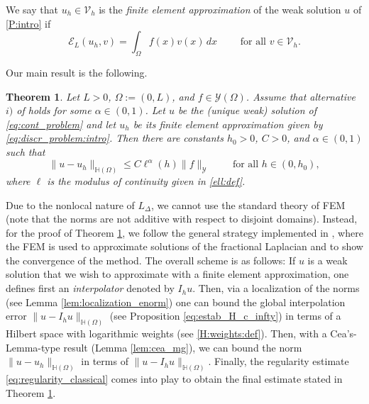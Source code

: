 \documentclass[10 pt]{article}
\newtheorem{theorem}{Theorem}[section]
\numberwithin{equation}{section}
\def\cE{\mathcal{E}}
\begin{document}
We say that  $u_h\in \mathcal V_h$ is the \emph{finite element approximation} of the weak solution $u$ of \eqref{P:intro} if \begin{equation}\label{eq:discr_problem:intro}
    \cE_{L}(u_h,v)=\int_{\Omega} f(x) v(x)\, dx \qquad \text{ for all } v\in \mathcal V_h.
\end{equation}


 Our main result is the following.
 \begin{theorem}\label{main:thm:intro}
    Let $L>0$, $\Omega:=(0,L)$, and $f\in \mathcal{Y}(\Omega)$.  Assume that alternative $i)$ of  holds for some $\alpha\in(0,1)$. Let $u$ be the (unique weak) solution of \eqref{eq:cont_problem} and let $u_h$ be its finite element approximation given by \eqref{eq:discr_problem:intro}. Then there are constants $h_0>0$, $C>0$, and $\alpha\in(0,1)$ such that
    \begin{equation*}
        \|u-u_h\|_{\mathbb H(\Omega)}\leq C\ell^{\alpha}(h)\|f\|_{\mathcal Y}\qquad \text{ for all }h\in(0,h_0),
    \end{equation*}
    where $\ell$ is the modulus of continuity given in \eqref{ell:def}.
 \end{theorem}
 Due to the nonlocal nature of $L_\Delta$, we cannot use the standard theory of FEM (note that the norms are not additive with respect to disjoint domains). Instead, for the proof of Theorem \ref{main:thm:intro}, we follow the general strategy implemented in \cite{Bor17}, where the FEM is used to approximate solutions of the fractional Laplacian and to show the convergence of the method.  The overall scheme is as follows: If $u$ is a weak solution that we wish to approximate with a finite element approximation, one defines first an \emph{interpolator} denoted by $I_h u$.  Then, via a localization of the norms (see Lemma \ref{lem:localization_enorm}) one can bound the global interpolation error $\|u-I_h u\|_{\mathbb H(\Omega)}$ (see Proposition \ref{eq:estab_H_c_infty}) in terms of a Hilbert space with logarithmic weights (see \eqref{H:weights:def}).  Then, with a Cea's-Lemma-type result (Lemma \ref{lem:cea_mg}), we can bound the norm $\|u-u_h\|_{\mathbb H(\Omega)}$ in terms of $\|u-I_h u\|_{\mathbb H(\Omega)}$.  Finally, the regularity estimate \eqref{eq:regularity_classical} comes into play to obtain the final estimate stated in Theorem \ref{main:thm:intro}.
\end{document}
